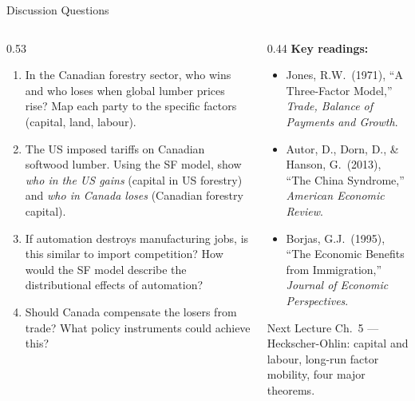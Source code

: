 \documentclass[aspectratio=169]{beamer}
\begin{document}
\begin{frame}[shrink=10]{Discussion Questions}
\begin{columns}[T]
\begin{column}{0.53\textwidth}
\begin{discuss}
\begin{enumerate}\small
  \item In the Canadian forestry sector, who wins and who
        loses when global lumber prices rise?  Map each
        party to the specific factors (capital, land,
        labour).
  \item The US imposed tariffs on Canadian softwood lumber.
        Using the SF model, show \emph{who in the US
        gains} (capital in US forestry) and \emph{who in
        Canada loses} (Canadian forestry capital).
  \item If automation destroys manufacturing jobs, is
        this similar to import competition?  How would
        the SF model describe the distributional effects
        of automation?
  \item Should Canada compensate the losers from trade?
        What policy instruments could achieve this?
\end{enumerate}
\end{discuss}
\end{column}
\begin{column}{0.44\textwidth}
\textbf{Key readings:}
\begin{itemize}\footnotesize
  \item Jones, R.W.\ (1971), ``A Three-Factor Model,''
        \textit{Trade, Balance of Payments and Growth}.
  \item Autor, D., Dorn, D., \& Hanson, G.\ (2013),
        ``The China Syndrome,''
        \textit{American Economic Review}.
  \item Borjas, G.J.\ (1995), ``The Economic Benefits
        from Immigration,''
        \textit{Journal of Economic Perspectives}.
\end{itemize}
\vspace{0.4em}
\begin{block}{Next Lecture}
\small Ch.~5 --- Heckscher-Ohlin: capital and labour,
long-run factor mobility, four major theorems.
\end{block}
\end{column}
\end{columns}
\end{frame}
\end{document}
